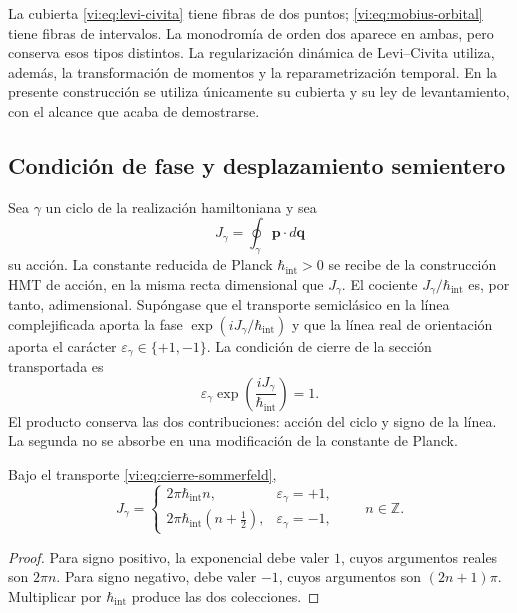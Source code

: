 La cubierta \eqref{vi:eq:levi-civita} tiene fibras de dos
puntos; \eqref{vi:eq:mobius-orbital} tiene fibras de
intervalos. La monodromía de orden dos aparece en ambas,
pero conserva esos tipos distintos. La regularización
dinámica de Levi--Civita utiliza, además, la transformación
de momentos y la reparametrización temporal. En la presente
construcción se utiliza únicamente su cubierta y su ley de
levantamiento, con el alcance que acaba de demostrarse.

\subsection{Condición de fase y desplazamiento semientero}
\label{vi:subsec:sommerfeld}

Sea $\gamma$ un ciclo de la realización hamiltoniana y sea
\begin{equation}
 J_\gamma=\oint_\gamma\mathbf p\cdot d\mathbf q
 \label{vi:eq:accion-ciclo}
\end{equation}
su acción. La constante reducida de Planck
$\hbar_{\mathrm{int}}>0$ se recibe de la construcción HMT
de acción, en la misma recta dimensional que $J_\gamma$.
El cociente $J_\gamma/\hbar_{\mathrm{int}}$ es, por tanto,
adimensional. Supóngase que el transporte semiclásico en la
línea complejificada aporta la fase
$\exp(iJ_\gamma/\hbar_{\mathrm{int}})$ y que la línea real
de orientación aporta el carácter
$\varepsilon_\gamma\in\{+1,-1\}$. La condición de cierre
de la sección transportada es
\begin{equation}
 \varepsilon_\gamma
       \exp\!\left(\frac{iJ_\gamma}{\hbar_{\mathrm{int}}}\right)=1.
 \label{vi:eq:cierre-sommerfeld}
\end{equation}
El producto conserva las dos contribuciones: acción del
ciclo y signo de la línea. La segunda no se absorbe en una
modificación de la constante de Planck.

\begin{theorem}
\label{vi:thm:sommerfeld}
Bajo el transporte \eqref{vi:eq:cierre-sommerfeld},
\begin{equation}
 J_\gamma=
 \begin{cases}
  2\pi\hbar_{\mathrm{int}}n,
          &\varepsilon_\gamma=+1,\\[1mm]
  2\pi\hbar_{\mathrm{int}}(n+\tfrac12),
          &\varepsilon_\gamma=-1,
 \end{cases}
 \qquad n\in\mathbb Z.
 \label{vi:eq:accion-sommerfeld}
\end{equation}
\end{theorem}
\begin{proof}
Para signo positivo, la exponencial debe valer $1$, cuyos
argumentos reales son $2\pi n$. Para signo negativo, debe
valer $-1$, cuyos argumentos son $(2n+1)\pi$. Multiplicar
por $\hbar_{\mathrm{int}}$ produce las dos colecciones.
\end{proof}

